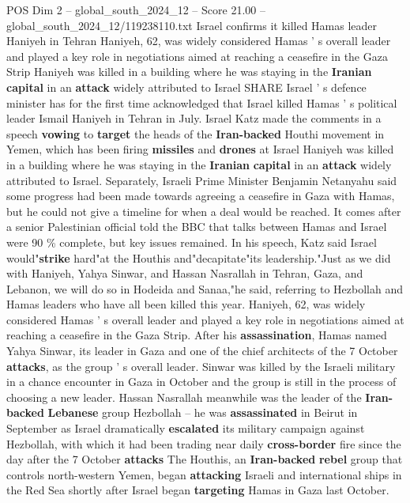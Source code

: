 \begin{textsample}{POS Dim 2 – global\_south\_2024\_12 – Score 21.00 – global\_south\_2024\_12/119238110.txt}  \label{ex:f2_pos_206}
Israel confirms it killed Hamas leader Haniyeh in Tehran Haniyeh, 62, was widely considered Hamas ' s overall leader and played a key role in negotiations aimed at reaching a ceasefire in the Gaza Strip Haniyeh was killed in a building where he was staying in the \textbf{Iranian} \textbf{capital} in an \textbf{attack} widely attributed to Israel SHARE Israel ' s defence minister has for the first time acknowledged that Israel killed Hamas ' s political leader Ismail Haniyeh in Tehran in July.
Israel Katz made the comments in a speech \textbf{vowing} to \textbf{target} the heads of the \textbf{Iran-backed} Houthi movement in Yemen, which has been firing \textbf{missiles} and \textbf{drones} at Israel Haniyeh was killed in a building where he was staying in the \textbf{Iranian} \textbf{capital} in an \textbf{attack} widely attributed to Israel.
Separately, Israeli Prime Minister Benjamin Netanyahu said some progress had been made towards agreeing a ceasefire in Gaza with Hamas, but he could not give a timeline for when a deal would be reached.
It comes after a senior Palestinian official told the BBC that talks between Hamas and Israel were 90 \% complete, but key issues remained.
In his speech, Katz said Israel would"\textbf{strike} hard"at the Houthis and"decapitate"its leadership."Just as we did with Haniyeh, Yahya Sinwar, and Hassan Nasrallah in Tehran, Gaza, and Lebanon, we will do so in Hodeida and Sanaa,"he said, referring to Hezbollah and Hamas leaders who have all been killed this year.
Haniyeh, 62, was widely considered Hamas ' s overall leader and played a key role in negotiations aimed at reaching a ceasefire in the Gaza Strip.
After his \textbf{assassination}, Hamas named Yahya Sinwar, its leader in Gaza and one of the chief architects of the 7 October \textbf{attacks}, as the group ' s overall leader.
Sinwar was killed by the Israeli military in a chance encounter in Gaza in October and the group is still in the process of choosing a new leader.
Hassan Nasrallah meanwhile was the leader of the \textbf{Iran-backed} \textbf{Lebanese} group Hezbollah -- he was \textbf{assassinated} in Beirut in September as Israel dramatically \textbf{escalated} its military campaign against Hezbollah, with which it had been trading near daily \textbf{cross-border} fire since the day after the 7 October \textbf{attacks} The Houthis, an \textbf{Iran-backed} \textbf{rebel} group that controls north-western Yemen, began \textbf{attacking} Israeli and international ships in the Red Sea shortly after Israel began \textbf{targeting} Hamas in Gaza last October.

\end{textsample}
